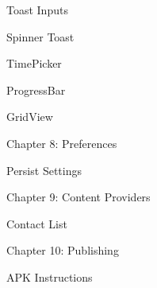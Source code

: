 \begin{DoxyItemize}
\begin{DoxyItemize}
\item Toast Inputs
\item Spinner Toast
\item Time\+Picker
\item Progress\+Bar
\item Grid\+View
\end{DoxyItemize}
\item Chapter 8\+: Preferences
\begin{DoxyItemize}
\item Persist Settings
\end{DoxyItemize}
\item Chapter 9\+: Content Providers
\begin{DoxyItemize}
\item Contact List
\end{DoxyItemize}
\item Chapter 10\+: Publishing
\begin{DoxyItemize}
\item A\+PK Instructions 
\end{DoxyItemize}
\end{DoxyItemize}